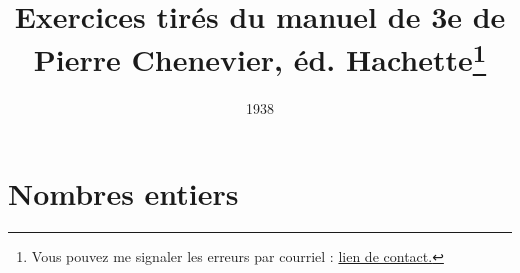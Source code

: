 \documentclass[12 pt]{report}
\author{ }
\title{\Large Exercices tirés du manuel de 3e de Pierre Chenevier, éd. Hachette\footnote{Vous pouvez me signaler les erreurs par courriel : \href{mailto:leturcq.d@orange.fr}{lien de contact.} 
	}
	}
\date{1938}
\theoremstyle{plain}
\newcounter{n}
\begin{document}
	\maketitle 
	
	
	
\part{Nombres entiers}
 
 
 
 
 
 
 
 
% 
% 
% 
% 
% 
% 
% 
% 
%  
% 
% 
% 
% 
% 
% 
% 
% 
% 
% 
% 
% 
% 
% 
% 
% 
% 
% 
% 
 
 
 	
\end{document}
